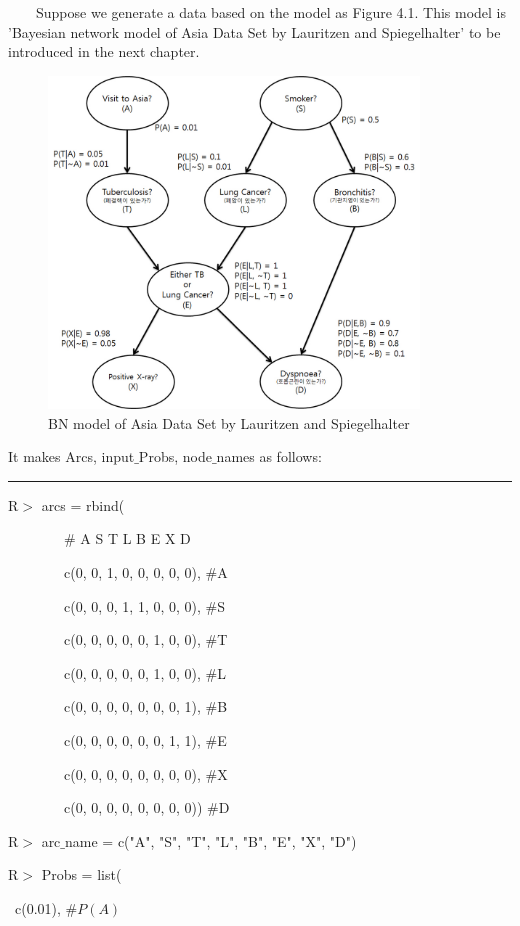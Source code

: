 ~~~~Suppose we generate a data based on the model as Figure 4.1. This model is 'Bayesian network model of Asia Data Set by Lauritzen and Spiegelhalter' to be introduced in the next chapter.

\begin{figure}[t]
	\centering
	\includegraphics[height=250pt]{Real_Asia}
	\caption{BN model of Asia Data Set by Lauritzen and Spiegelhalter}
\end{figure}

It makes Arcs, input$\_$Probs, node$\_$names as follows:

\begin{center}\rule[0.5ex]{0.9\columnwidth}{1pt}\end{center}

R$>$ arcs = rbind(

		~~~~~~~~$\#$	A	S	T	L	B	E	X	D
		
		~~~~~~~~c(0,	0,	1,	0,	0,	0,	0,	0),	$\#$A
		
		~~~~~~~~c(0,	0,	0,	1,	1,	0,	0,	0),	$\#$S
		
		~~~~~~~~c(0,	0,	0,	0,	0,	1,	0,	0),	$\#$T
		
		~~~~~~~~c(0,	0,	0,	0,	0,	1,	0,	0),	$\#$L
		
		~~~~~~~~c(0,	0,	0,	0,	0,	0,	0,	1),	$\#$B
		
		~~~~~~~~c(0,	0,	0,	0,	0,	0,	1,	1),	$\#$E
		
		~~~~~~~~c(0,	0,	0,	0,	0,	0,	0,	0),	$\#$X
		
		~~~~~~~~c(0,	0,	0,	0,	0,	0,	0,	0))	$\#$D
		
R$>$ arc$\_$name = c("A", "S", "T", "L", "B", "E", "X", "D")

R$>$ Probs = list(

	~c(0.01),						$\# P(A)$
	

